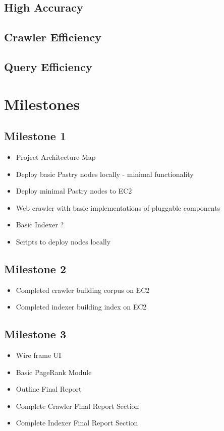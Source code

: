\documentclass[11pt, twocolumn]{article}
\begin{document}
\subsection{ High Accuracy }
\subsection{ Crawler Efficiency }
\subsection{ Query Efficiency }

\section{ Milestones }

\subsection{Milestone 1}

\begin{itemize}
\item            Project Architecture Map
\item            Deploy basic Pastry nodes locally - minimal functionality
\item            Deploy minimal Pastry nodes to EC2
\item            Web crawler with basic implementations of pluggable components
\item            Basic Indexer ?
\item            Scripts to deploy nodes locally 
\end{itemize}


\subsection{Milestone 2}

\begin{itemize}
\item            Completed crawler building corpus on EC2
\item            Completed indexer building index on EC2
\end{itemize}


\subsection{Milestone 3}

\begin{itemize}
\item            Wire frame UI
\item            Basic PageRank Module
\item            Outline Final Report
\item            Complete Crawler Final Report Section
\item            Complete Indexer Final Report Section
\end{itemize}
\end{document}
